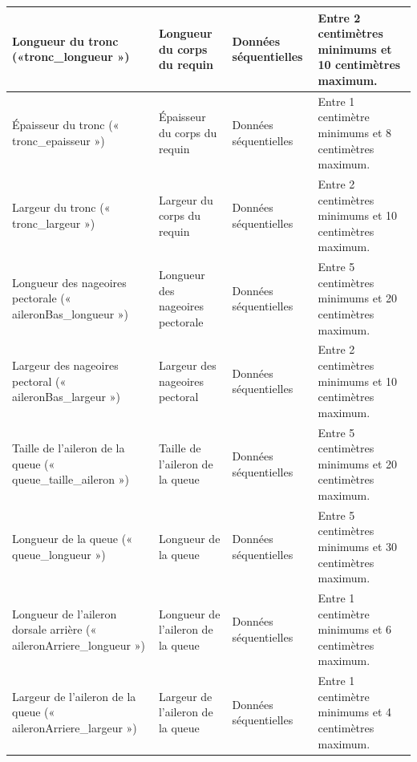 \documentclass{article}
\begin{document}
\begin{longtable}[h]{|p{} | p{}|p{}|p{}|}
	Longueur du tronc («tronc\_longueur »)                               & Longueur du corps du requin                                                       & Données séquentielles & Entre 2 centimètres minimums et 10 centimètres maximum.    \\ \hline
	Épaisseur du tronc (« tronc\_epaisseur »)                            & Épaisseur du corps du requin                                                      & Données séquentielles & Entre 1 centimètre minimums et 8 centimètres maximum.      \\ \hline
	Largeur du tronc (« tronc\_largeur »)                                & Largeur du corps du requin                                                        & Données séquentielles & Entre 2 centimètres minimums et 10 centimètres maximum.    \\ \hline
	Longueur des nageoires pectorale (« aileronBas\_longueur »)          & Longueur des nageoires pectorale                                                  & Données séquentielles & Entre 5 centimètres minimums et 20 centimètres maximum.    \\ \hline
	Largeur des nageoires pectoral (« aileronBas\_largeur »)             & Largeur des nageoires pectoral                                                    & Données séquentielles & Entre 2 centimètres minimums et 10 centimètres maximum.    \\ \hline
	Taille de l’aileron de la queue (« queue\_taille\_aileron »)         & Taille de l’aileron de la queue                                                   & Données séquentielles & Entre 5 centimètres minimums et 20 centimètres maximum.    \\ \hline
	Longueur de la queue (« queue\_longueur »)                           & Longueur de la queue                                                              & Données séquentielles & Entre 5 centimètres minimums et 30 centimètres maximum.    \\ \hline
	Longueur de l’aileron dorsale arrière (« aileronArriere\_longueur ») & Longueur de l’aileron de la queue                                                 & Données séquentielles & Entre 1 centimètre minimums et 6 centimètres maximum.      \\ \hline
	Largeur de l’aileron de la queue (« aileronArriere\_largeur »)       & Largeur de l’aileron de la queue                                                  & Données séquentielles & Entre 1 centimètre minimums et 4 centimètres maximum.      \\ \hline

\end{longtable}
\end{document}
